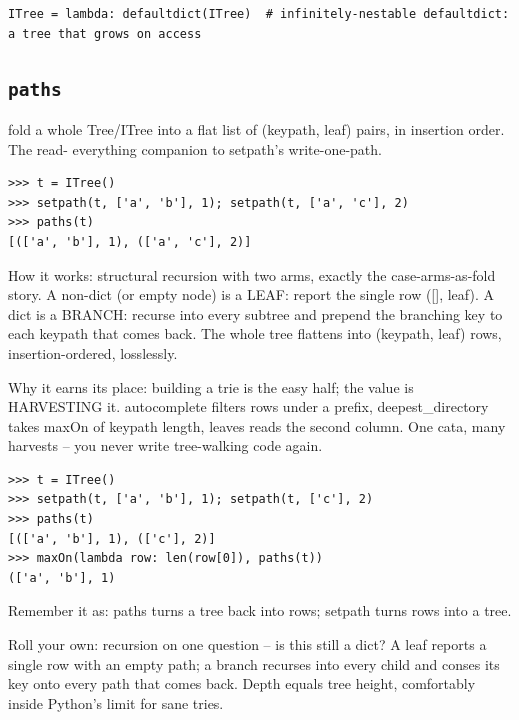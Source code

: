 \documentclass[10pt,letterpaper]{book}
\begin{document}
\begin{lstlisting}[style=ex]
ITree = lambda: defaultdict(ITree)  # infinitely-nestable defaultdict: a tree that grows on access
\end{lstlisting}

\subsection{\texttt{paths}}\label{def:paths}
fold a whole Tree/ITree into a flat list of (keypath, leaf) pairs, in insertion order. The read- everything companion to setpath's write-one-path.
\begin{lstlisting}[style=ex]
>>> t = ITree()
>>> setpath(t, ['a', 'b'], 1); setpath(t, ['a', 'c'], 2)
>>> paths(t)
[(['a', 'b'], 1), (['a', 'c'], 2)]
\end{lstlisting}

How it works: structural recursion with two arms, exactly the case-arms-as-fold story. A non-dict (or empty node) is a LEAF: report the single row ([], leaf). A dict is a BRANCH: recurse into every subtree and prepend the branching key to each keypath that comes back. The whole tree flattens into (keypath, leaf) rows, insertion-ordered, losslessly.


Why it earns its place: building a trie is the easy half; the value is HARVESTING it. autocomplete filters rows under a prefix, deepest\_directory takes maxOn of keypath length, leaves reads the second column. One cata, many harvests -- you never write tree-walking code again.

\begin{lstlisting}[style=ex]
>>> t = ITree()
>>> setpath(t, ['a', 'b'], 1); setpath(t, ['c'], 2)
>>> paths(t)
[(['a', 'b'], 1), (['c'], 2)]
>>> maxOn(lambda row: len(row[0]), paths(t))
(['a', 'b'], 1)
\end{lstlisting}

Remember it as: paths turns a tree back into rows; setpath turns rows into a tree.


Roll your own: recursion on one question -- is this still a dict? A leaf reports a single row with an empty path; a branch recurses into every child and conses its key onto every path that comes back. Depth equals tree height, comfortably inside Python's limit for sane tries.
\end{document}

